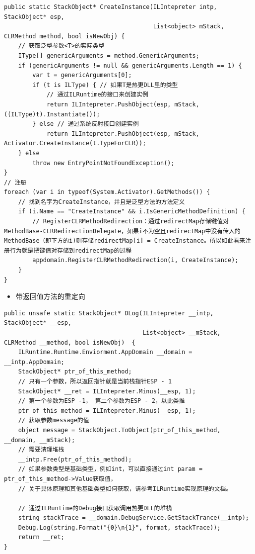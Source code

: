 \documentclass[9pt, b5paper]{article}
\begin{document}
\begin{verbatim}
public static StackObject* CreateInstance(ILIntepreter intp, StackObject* esp,
                                          List<object> mStack, CLRMethod method, bool isNewObj) {
    // 获取泛型参数<T>的实际类型
    IType[] genericArguments = method.GenericArguments;
    if (genericArguments != null && genericArguments.Length == 1) {
        var t = genericArguments[0];
        if (t is ILType) { // 如果T是热更DLL里的类型 
            // 通过ILRuntime的接口来创建实例
            return ILIntepreter.PushObject(esp, mStack, ((ILType)t).Instantiate());
        } else // 通过系统反射接口创建实例
            return ILIntepreter.PushObject(esp, mStack, Activator.CreateInstance(t.TypeForCLR));
    } else
        throw new EntryPointNotFoundException();
}
// 注册
foreach (var i in typeof(System.Activator).GetMethods()) {
    // 找到名字为CreateInstance，并且是泛型方法的方法定义
    if (i.Name == "CreateInstance" && i.IsGenericMethodDefinition) {
        // RegisterCLRMethodRedirection：通过redirectMap存储键值对MethodBase-CLRRedirectionDelegate，如果i不为空且redirectMap中没有传入的MethodBase（即下方的i)则存储redirectMap[i] = CreateInstance。所以如此看来注册行为就是把键值对存储到redirectMap的过程
        appdomain.RegisterCLRMethodRedirection(i, CreateInstance);
    }
}
\end{verbatim}
\begin{itemize}
\item 带返回值方法的重定向
\end{itemize}
\begin{verbatim}
public unsafe static StackObject* DLog(ILIntepreter __intp, StackObject* __esp,
                                       List<object> __mStack, CLRMethod __method, bool isNewObj)  {
    ILRuntime.Runtime.Enviorment.AppDomain __domain = __intp.AppDomain;
    StackObject* ptr_of_this_method;
    // 只有一个参数，所以返回指针就是当前栈指针ESP - 1
    StackObject* __ret = ILIntepreter.Minus(__esp, 1);
    // 第一个参数为ESP -1， 第二个参数为ESP - 2，以此类推
    ptr_of_this_method = ILIntepreter.Minus(__esp, 1);
    // 获取参数message的值
    object message = StackObject.ToObject(ptr_of_this_method, __domain, __mStack);
    // 需要清理堆栈
    __intp.Free(ptr_of_this_method);
    // 如果参数类型是基础类型，例如int，可以直接通过int param = ptr_of_this_method->Value获取值，
    // 关于具体原理和其他基础类型如何获取，请参考ILRuntime实现原理的文档。
            
    // 通过ILRuntime的Debug接口获取调用热更DLL的堆栈
    string stackTrace = __domain.DebugService.GetStackTrance(__intp);
    Debug.Log(string.Format("{0}\n{1}", format, stackTrace));
    return __ret;
}
\end{verbatim}
\end{document}
